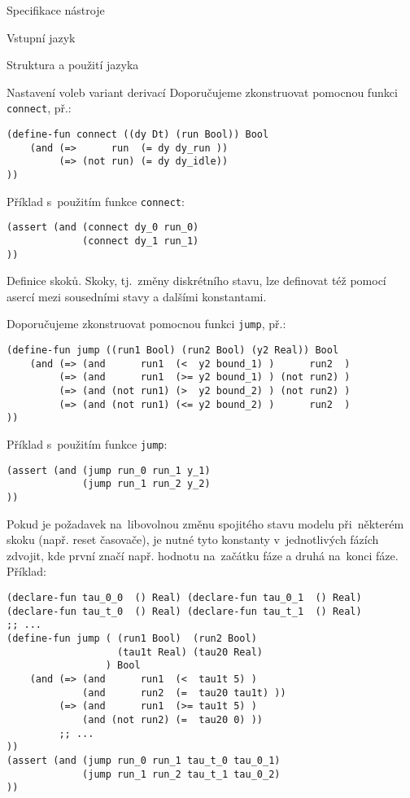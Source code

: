 \documentclass[thesis=M,czech]{FITthesis}[2012/06/26]
\newcommand{\id}[1]{\texttt{#1}}
\begin{document}
\begin{section}{Specifikace nástroje}
\begin{subsection}{Vstupní jazyk}
\begin{subsubsection}{Struktura a použití jazyka}
\begin{paragraph}{Nastavení voleb variant derivací}
Doporučujeme zkonstruovat pomocnou funkci \id{connect}, př.:
\begin{Verbatim}[samepage=true]
(define-fun connect ((dy Dt) (run Bool)) Bool
    (and (=>      run  (= dy dy_run ))
         (=> (not run) (= dy dy_idle))
))
\end{Verbatim}

Příklad s~použitím funkce \id{connect}:
\begin{Verbatim}[samepage=true]
(assert (and (connect dy_0 run_0)
             (connect dy_1 run_1)
))
\end{Verbatim}
\end{paragraph} %


\begin{paragraph}{Definice skoků.}\label{p:design:spec:ilang:struct:jump}
Skoky, tj.~změny diskrétního stavu,
lze definovat též pomocí asercí
mezi sousedními stavy a dalšími konstantami.

Doporučujeme zkonstruovat pomocnou funkci \id{jump}, př.:
\begin{Verbatim}[samepage=true]
(define-fun jump ((run1 Bool) (run2 Bool) (y2 Real)) Bool
    (and (=> (and      run1  (<  y2 bound_1) )      run2  )
         (=> (and      run1  (>= y2 bound_1) ) (not run2) )
         (=> (and (not run1) (>  y2 bound_2) ) (not run2) )
         (=> (and (not run1) (<= y2 bound_2) )      run2  )
))
\end{Verbatim}

Příklad s~použitím funkce \id{jump}:
\begin{Verbatim}[samepage=true]
(assert (and (jump run_0 run_1 y_1)
             (jump run_1 run_2 y_2)
))
\end{Verbatim}

Pokud je požadavek na~libovolnou změnu
spojitého stavu modelu při~některém skoku
(např. reset časovače),
je nutné tyto konstanty v~jednotlivých fázích zdvojit,
kde první značí např. hodnotu na~začátku fáze
a druhá na~konci fáze.
Příklad:
\begin{Verbatim}[samepage=true]
(declare-fun tau_0_0  () Real) (declare-fun tau_0_1  () Real)
(declare-fun tau_t_0  () Real) (declare-fun tau_t_1  () Real)
;; ...
(define-fun jump ( (run1 Bool)  (run2 Bool)
                   (tau1t Real) (tau20 Real)
                 ) Bool
    (and (=> (and      run1  (<  tau1t 5) )
             (and      run2  (=  tau20 tau1t) ))
         (=> (and      run1  (>= tau1t 5) )
             (and (not run2) (=  tau20 0) ))
         ;; ...
))
(assert (and (jump run_0 run_1 tau_t_0 tau_0_1)
             (jump run_1 run_2 tau_t_1 tau_0_2)
))
\end{Verbatim}
\end{paragraph} %


\end{subsubsection}
\end{subsection}
\end{section}
\end{document}
